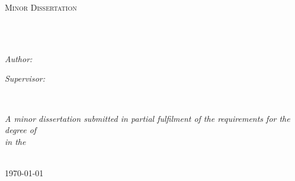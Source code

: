 \documentclass[
11pt, %
english, %
singlespacing, %
parskip, %
headsepline, %
chapterinoneline, %
oneside
]{MastersDoctoralThesis} %
\author{Henri Izak David \textsc{du Plessis}} %
\begin{document}
\frontmatter %

\pagestyle{plain} %


\begin{titlepage}
\begin{center}

\vspace*{.06\textheight}
{\scshape\LARGE \univname\par}\vspace{1.5cm} %
\textsc{\Large Minor Dissertation}\\[0.5cm] %

\HRule \\[0.4cm] %
{\huge \bfseries \ttitle\par}\vspace{0.4cm} %
\HRule \\[1.5cm] %
 
\begin{minipage}[t]{0.4\textwidth}
\begin{flushleft} \large
\emph{Author:}\\
{\authorname} %
\end{flushleft}
\end{minipage}
\begin{minipage}[t]{0.4\textwidth}
\begin{flushright} \large
\emph{Supervisor:} \\
{\supname} %
\end{flushright}
\end{minipage}\\[3cm]
 
\vfill

\large \textit{A minor dissertation submitted in partial fulfilment of the requirements for the degree of \degreename}\\[0.3cm] %
\textit{in the}\\[0.4cm]
\deptname\\[2cm] %
 
\vfill

{\large \today}\\[4cm] %
 
\vfill
\end{center}
\end{titlepage}
\end{document}

